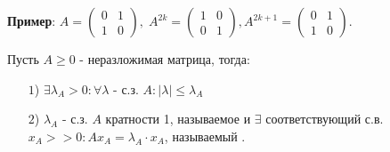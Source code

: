 \textbf{Пример}: $A = \begin{pmatrix}
	0 & 1 \\ 1 & 0
\end{pmatrix}, \; A^{2k} = \begin{pmatrix}
	1 & 0 \\ 0 & 1
\end{pmatrix}, A^{2k+1} = \begin{pmatrix}
	0 & 1 \\ 1 & 0
\end{pmatrix}$.

\begin{theorem}\label{cha:7/the:1}
	Пусть $A \ge 0$ - неразложимая матрица, тогда:
	\begin{itemize}
		\item[$1$)]
			$\exists \lambda_A > 0: \forall \lambda$ - с.з. $A: |\lambda| \le \lambda_A$
		\item[$2$)]
			$\lambda_A$ - с.з. $A$ кратности 1, называемое  и $\exists$ соответствующий с.в. $x_A >> 0: A x_A = \lambda_A \cdot x_A$, называемый .
	\end{itemize}
\end{theorem}
